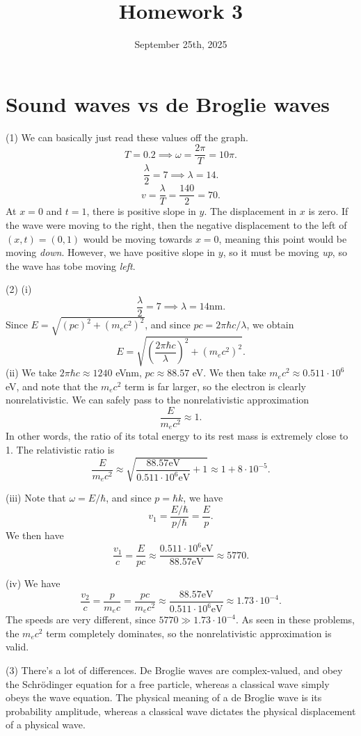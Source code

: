 \documentclass[11pt, letterpaper]{article}
\title{Homework 3}
\date{September 25th, 2025}
\begin{document}
\makeproblem


\section{Sound waves vs de Broglie waves}

(1) We can basically just read these values off the graph.
\[
	T=0.2 \implies \omega =\frac{2\pi }{T} =10\pi 
.\]
\[
	\frac{\lambda }{2} =7\implies \lambda =14
.\]
\[
	v=\frac{\lambda }{T} =\frac{140}{2} =70
.\]
At $x=0$ and $t=1$, there is positive slope in $y$. The displacement in $x$ is zero. If the wave were moving to the right, then the negative displacement to the left of $(x,t)=(0,1)$ would be moving towards $x=0$, meaning this point would be moving \emph{down}. However, we have positive slope in $y$, so it must be moving \emph{up}, so the wave has tobe moving \emph{left}.

(2) (i)
\[
	\frac{\lambda }{2} =7 \implies \lambda =14 \mathrm{nm} 
.\]
Since $E=\sqrt{(pc)^2+(m_ec^2)^2} $, and since $pc=2\pi \hbar c/\lambda $, we obtain
\[
	E=\sqrt{\left( \frac{2\pi \hbar c}{\lambda }  \right) ^2+\left( m_ec^2 \right) ^2} 
.\]
(ii) We take $2\pi \hbar c \approx 1240$ eVnm, $pc \approx 88.57$ eV. We then take $m_ec^2 \approx 0.511 \cdot 10^6$ eV, and note that the $m_ec^2$ term is far larger, so the electron is clearly nonrelativistic. We can safely pass to the nonrelativistic approximation
\[
	\frac{E}{m_ec^2} \approx 1
.\]
In other words, the ratio of its total energy to its rest mass is extremely close to 1. The relativistic ratio is
\[
	\frac{E}{m_ec^2} \approx \sqrt{\frac{88.57\mathrm{eV} }{0.511\cdot 10^6\mathrm{eV} } +1} \approx 1+8\cdot 10^{-5} 
.\]

(iii) Note that $\omega =E/\hbar$, and since $p=\hbar k$, we have
\[
	v_1=\frac{E/\hbar}{p /\hbar} =\frac{E}{p} 
.\]
We then have
\[
	\frac{v_1}{c} =\frac{E}{pc} \approx \frac{0.511\cdot 10^6 \mathrm{eV} }{88.57 \mathrm{eV} } \approx 5770
.\]

(iv) We have
\[
	\frac{v_2}{c} =\frac{p}{m_ec} =\frac{pc}{m_ec^2} \approx \frac{88.57\mathrm{eV} }{0.511\cdot 10^6\mathrm{eV} } \approx 1.73\cdot 10^{-4} 
.\]
The speeds are very different, since $5770 \gg 1.73\cdot 10^{-4} $. As seen in these problems, the $m_ec^2$ term completely dominates, so the nonrelativistic approximation is valid.

(3) There's a lot of differences. De Broglie waves are complex-valued, and obey the Schr\"odinger equation for a free particle, whereas a classical wave simply obeys the wave equation. The physical meaning of a de Broglie wave is its probability amplitude, whereas a classical wave dictates the physical displacement of a physical wave.
\end{document}
